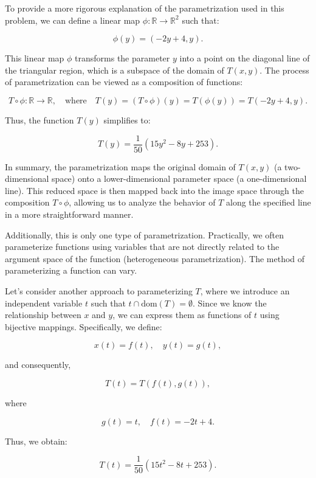 \documentclass[12pt,a4paper]{article}
\begin{document}
\begin{remark}
To provide a more rigorous explanation of the parametrization used in this problem, we can define a linear map \( \phi: \mathbb{R} \to \mathbb{R}^2 \) such that:

\[
\phi(y) = (-2y + 4, y).
\]

This linear map \( \phi \) transforms the parameter \( y \) into a point on the diagonal line of the triangular region, which is a subspace of the domain of \( T(x, y) \). The process of parametrization can be viewed as a composition of functions:

\[
T \circ \phi: \mathbb{R} \to \mathbb{R}, \quad \text{where} \quad T(y) = (T \circ \phi)(y) = T(\phi(y)) = T(-2y + 4, y).
\]

Thus, the function \( T(y) \) simplifies to:

\[
T(y) = \frac{1}{50} \left(15y^2 - 8y + 253\right).
\]

In summary, the parametrization maps the original domain of \( T(x, y) \) (a two-dimensional space) onto a lower-dimensional parameter space (a one-dimensional line). This reduced space is then mapped back into the image space through the composition \( T \circ \phi \), allowing us to analyze the behavior of \( T \) along the specified line in a more straightforward manner.

Additionally, this is only one type of parametrization. Practically, we often parameterize functions using variables that are not directly related to the argument space of the function (heterogeneous parametrization). The method of parameterizing a function can vary. 

Let's consider another approach to parameterizing \( T \), where we introduce an independent variable \( t \) such that \( t \cap \text{dom}(T) = \emptyset \). Since we know the relationship between \( x \) and \( y \), we can express them as functions of \( t \) using bijective mappings. Specifically, we define:

\[
x(t) = f(t), \quad y(t) = g(t),
\]

and consequently,

\[
T(t) = T(f(t), g(t)),
\]

where

\[
g(t) = t, \quad f(t) = -2t + 4.
\]

Thus, we obtain:

\[
T(t) = \frac{1}{50} \left(15t^2 - 8t + 253\right).
\]


\end{remark}
\end{document}
